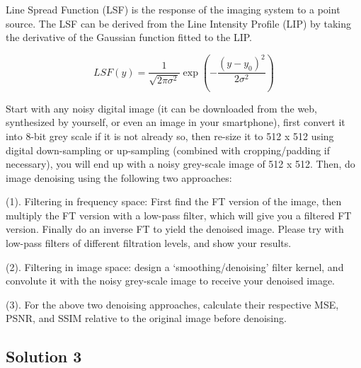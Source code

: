 \documentclass[12pt, a4paper, oneside]{ctexart}
\begin{document}


Line Spread Function (LSF) is the response of the imaging system to a point source. The LSF can be derived from the Line Intensity Profile (LIP) by taking the derivative of the Gaussian function fitted to the LIP.


\[LSF(y) = \frac{1}{\sqrt{2\pi\sigma^2}} \exp\left(-\frac{(y - y_0)^2}{2\sigma^2}\right)\]






\begin{problem}

Start with any noisy digital image (it can be downloaded from the web, synthesized by yourself, or even an image in your smartphone), first convert it into 8-bit grey scale if it is not already so, then re-size it to 512 x 512 using digital down-sampling or up-sampling (combined with cropping/padding if necessary), you will end up with a noisy grey-scale image of 512 x 512. Then, do image denoising using the following two approaches:

(1). Filtering in frequency space: First find the FT version of the image, then multiply the FT version with a low-pass filter, which will give you a filtered FT version. Finally do an inverse FT to yield the denoised image.  Please try with low-pass filters of different filtration levels, and show your results.

(2). Filtering in image space: design a ‘smoothing/denoising’ filter kernel, and convolute it with the noisy grey-scale image to receive your denoised image.

(3). For the above two denoising approaches, calculate their respective MSE, PSNR, and SSIM relative to the original image before denoising.

\end{problem}


\subsection*{Solution 3}
\end{document}
